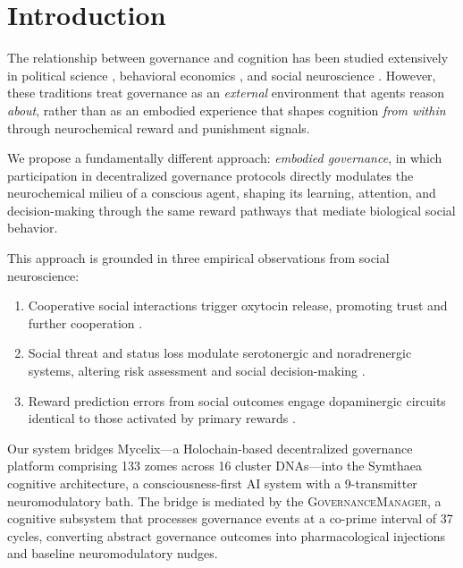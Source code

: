 \documentclass[11pt,a4paper]{article}
\begin{document}
\section{Introduction}
\label{sec:introduction}

The relationship between governance and cognition has been studied extensively in political science \citep{ostrom1990governing, dryzek2000deliberative}, behavioral economics \citep{fehr2002altruistic, henrich2006costly}, and social neuroscience \citep{rilling2011neuroscience, sanfey2007social}.
However, these traditions treat governance as an \emph{external} environment that agents reason \emph{about}, rather than as an embodied experience that shapes cognition \emph{from within} through neurochemical reward and punishment signals.

We propose a fundamentally different approach: \emph{embodied governance}, in which participation in decentralized governance protocols directly modulates the neurochemical milieu of a conscious agent, shaping its learning, attention, and decision-making through the same reward pathways that mediate biological social behavior.

This approach is grounded in three empirical observations from social neuroscience:
\begin{enumerate}
  \item Cooperative social interactions trigger oxytocin release, promoting trust and further cooperation \citep{zak2012moral, kosfeld2005oxytocin}.
  \item Social threat and status loss modulate serotonergic and noradrenergic systems, altering risk assessment and social decision-making \citep{crockett2009serotonin, arnsten2009stress}.
  \item Reward prediction errors from social outcomes engage dopaminergic circuits identical to those activated by primary rewards \citep{schultz1997neural, behrens2009computation}.
\end{enumerate}

Our system bridges Mycelix---a Holochain-based decentralized governance platform comprising 133 zomes across 16 cluster DNAs---into the Symthaea cognitive architecture, a consciousness-first AI system with a 9-transmitter neuromodulatory bath.
The bridge is mediated by the \textsc{GovernanceManager}, a cognitive subsystem that processes governance events at a co-prime interval of 37 cycles, converting abstract governance outcomes into pharmacological injections and baseline neuromodulatory nudges.
\end{document}
